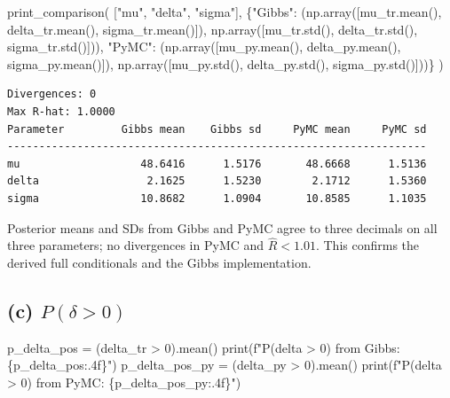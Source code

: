 \documentclass[
  letterpaper,
  DIV=11,
  numbers=noendperiod]{scrartcl}
\newenvironment{Shaded}{\begin{snugshade}}{\end{snugshade}}
\newcommand{\BuiltInTok}[1]{\textcolor[rgb]{0.00,0.23,0.31}{#1}}
\newcommand{\DecValTok}[1]{\textcolor[rgb]{0.68,0.00,0.00}{#1}}
\newcommand{\NormalTok}[1]{\textcolor[rgb]{0.00,0.23,0.31}{#1}}
\newcommand{\OperatorTok}[1]{\textcolor[rgb]{0.37,0.37,0.37}{#1}}
\newcommand{\SpecialCharTok}[1]{\textcolor[rgb]{0.37,0.37,0.37}{#1}}
\newcommand{\SpecialStringTok}[1]{\textcolor[rgb]{0.13,0.47,0.30}{#1}}
\newcommand{\StringTok}[1]{\textcolor[rgb]{0.13,0.47,0.30}{#1}}
\begin{document}
\begin{Shaded}
\begin{Highlighting}[]
\NormalTok{print\_comparison(}
\NormalTok{    [}\StringTok{"mu"}\NormalTok{, }\StringTok{"delta"}\NormalTok{, }\StringTok{"sigma"}\NormalTok{],}
\NormalTok{    \{}\StringTok{"Gibbs"}\NormalTok{: (np.array([mu\_tr.mean(), delta\_tr.mean(), sigma\_tr.mean()]),}
\NormalTok{               np.array([mu\_tr.std(),  delta\_tr.std(),  sigma\_tr.std()])),}
     \StringTok{"PyMC"}\NormalTok{:  (np.array([mu\_py.mean(), delta\_py.mean(), sigma\_py.mean()]),}
\NormalTok{               np.array([mu\_py.std(),  delta\_py.std(),  sigma\_py.std()]))\}}
\NormalTok{)}
\end{Highlighting}
\end{Shaded}

\begin{verbatim}
Divergences: 0
Max R-hat: 1.0000
Parameter         Gibbs mean    Gibbs sd     PyMC mean     PyMC sd
------------------------------------------------------------------
mu                   48.6416      1.5176       48.6668      1.5136
delta                 2.1625      1.5230        2.1712      1.5360
sigma                10.8682      1.0904       10.8585      1.1035
\end{verbatim}

Posterior means and SDs from Gibbs and PyMC agree to three decimals on
all three parameters; no divergences in PyMC and \(\hat R < 1.01\). This
confirms the derived full conditionals and the Gibbs implementation.

\subsection{\texorpdfstring{(c)
\(P(\delta > 0)\)}{(c) P(\textbackslash delta \textgreater{} 0)}}\label{c-pdelta-0}

\begin{Shaded}
\begin{Highlighting}[]
\NormalTok{p\_delta\_pos }\OperatorTok{=}\NormalTok{ (delta\_tr }\OperatorTok{\textgreater{}} \DecValTok{0}\NormalTok{).mean()}
\BuiltInTok{print}\NormalTok{(}\SpecialStringTok{f"P(delta \textgreater{} 0) from Gibbs: }\SpecialCharTok{\{}\NormalTok{p\_delta\_pos}\SpecialCharTok{:.4f\}}\SpecialStringTok{"}\NormalTok{)}
\NormalTok{p\_delta\_pos\_py }\OperatorTok{=}\NormalTok{ (delta\_py }\OperatorTok{\textgreater{}} \DecValTok{0}\NormalTok{).mean()}
\BuiltInTok{print}\NormalTok{(}\SpecialStringTok{f"P(delta \textgreater{} 0) from PyMC:  }\SpecialCharTok{\{}\NormalTok{p\_delta\_pos\_py}\SpecialCharTok{:.4f\}}\SpecialStringTok{"}\NormalTok{)}
\end{Highlighting}
\end{Shaded}
\end{document}
